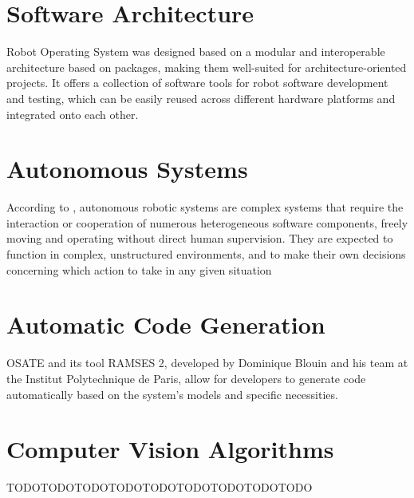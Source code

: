 \section{Software Architecture}
\cite{Bernardo2025, ROSWebsite} Robot Operating System was designed based on a modular and interoperable architecture based on packages, making them well-suited for architecture-oriented projects. It offers a collection of software tools for robot software development and testing, which can be easily reused across different hardware platforms and integrated onto each other.

\section{Autonomous Systems}
According to \cite{Wahde2016, Bensalem2009}, autonomous robotic systems are complex systems that require the interaction or cooperation of numerous heterogeneous software components, freely moving and operating without direct human supervision. They are expected to function in complex, unstructured environments, and to make their own decisions concerning which action to take in any given situation

\section{Automatic Code Generation}
OSATE and its tool RAMSES 2, developed by Dominique Blouin and his team at the Institut Polytechnique de Paris, allow for developers to generate code automatically based on the system's models and specific necessities.

\section{Computer Vision Algorithms}
TODOTODOTODOTODOTODOTODOTODOTODOTODO